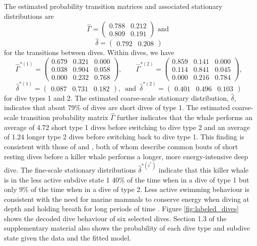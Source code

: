 The estimated probability transition matrices and associated stationary distributions are
%
$$\hat \Gamma = \begin{pmatrix} 
0.788 & 0.212 \\
0.809 & 0.191
\end{pmatrix} \text{ and }$$
$$\hat \delta = \begin{pmatrix} 0.792 & 0.208 \end{pmatrix}$$
%
for the transitions between dives. Within dives, we have
$$\hat \Gamma^{*(1)} = \begin{pmatrix} 
0.679 & 0.321 & 0.000 \\
0.038 & 0.904 & 0.058 \\
0.000 & 0.232 & 0.768
\end{pmatrix}, \qquad 
\hat \Gamma^{*(2)} = \begin{pmatrix} 
0.859 & 0.141 & 0.000 \\
0.114 & 0.841 & 0.045 \\
0.000 & 0.216 & 0.784
\end{pmatrix},$$
$$\hat \delta^{*(1)} = \begin{pmatrix} 0.087 & 0.731 & 0.182 \end{pmatrix}, \enspace \text{and} \enspace \hat \delta^{*(2)} = \begin{pmatrix} 0.401 & 0.496 & 0.103 \end{pmatrix}$$
%
for dive types 1 and 2.
The estimated coarse-scale stationary distribution, $\hat{\delta}$, indicates that about 79\% of dives are short dives of type 1. The estimated coarse-scale transition probability matrix $\hat \Gamma$ further indicates that the whale performs an average of 4.72 short type 1 dives before switching to dive type 2 and an average of 1.24 longer type 2 dives before switching back to dive type 1. This finding is consistent with those of \citet{Tennessen:2019b} and \citet{Williams:2009}, both of whom describe common bouts of short resting dives before a killer whale performs a longer, more energy-intensive deep dive. The fine-scale stationary distributions $\hat{\delta}^{*(i^*)}$ indicate that this killer whale is in the less active subdive state 1 40\% of the time when in a dive of type 1 but only 9\% of the time when in a dive of type 2. Less active swimming behaviour is consistent with the need for marine mammals to conserve energy when diving at depth and holding breath for long periods of time \citep{Williams:1999,Hastie:2006}. Figure \ref{fig:labeled_dives} shows the decoded dive behaviour of six selected dives. Section 1.3 of the supplementary material also shows the probability of each dive type and subdive state given the data and the fitted model.

